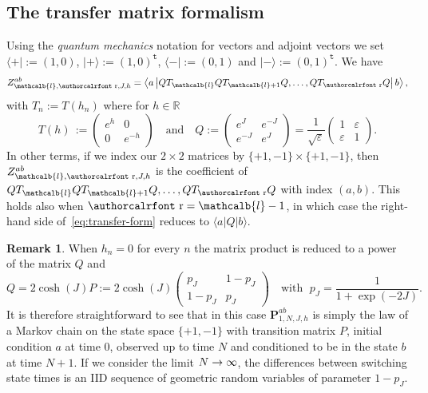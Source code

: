\documentclass[10pt]{amsart}
\theoremstyle{definition}\newtheorem{defi}[theo]{Definition}\newtheorem{rema}[theo]{Remark}\newtheorem{exam}[theo]{Example}\newtheorem{exem}[theo]{Example}\newtheorem{nota}[theo]{Notation}
\newcommand{\mathcalc}[1]{\text{\authorcalrfont #1}}
\newcommand{\bP}{\mathbf{P}}
\newcommand{\bbR}{\mathbb{R}}
\newcommand{\gep}{\varepsilon}
\newcommand{\ttt}{\mathtt{t}}
\newcommand{\tsp}{\ttt}
\renewcommand{\ell}{\mathcalb{l}}
\newcommand{\err}{\mathcalc{r}}
\renewcommand*{\to}{\mathchoice{\longrightarrow}{\rightarrow}{\rightarrow}{\rightarrow}}
\begin{document}
\subsection{The transfer matrix formalism}\label{sec:tm}

Using the \emph{quantum mechanics} notation for vectors and adjoint vectors we set $\langle +|:=(1,0)$, $|+ \rangle:=(1,0)^{\tsp}$, $\langle -|:=(0,1)$ and $| - \rangle := (0,1)^{\tsp}$. We have
\begin{equation}\label{eq:transfer-form}
{Z}_{\ell, \err, J, h}^{ab}= \left\langle a \left| Q T_\ell Q T_{\ell+1} Q,\dots, Q T_{\err} Q
\right| b \right\rangle,
\end{equation}
with $T_n:=T(h_n)$ where for $h \in \bbR$
\begin{equation}\label{eq:transmat}
T(h)\, :=
\begin{pmatrix}
e^{h} & 0\\
0 & e^{-h}
\end{pmatrix}
\quad\text{and} \quad Q :=
\begin{pmatrix}
e^{J} & e^{-J} \\
e^{-J} & e^{J}
\end{pmatrix} = \frac 1{\sqrt{\gep}}
\begin{pmatrix}
1 & \gep\\
\gep & 1
\end{pmatrix}
.
\end{equation}
In other terms, if we index our $2 \times 2$ matrices by $\{+1, -1\} \times \{+1, -1\}$, then ${Z}_{\ell, \err, J, h}^{ab}$ is the coefficient of $Q T_\ell Q T_{\ell+1} Q, \dots, Q T_{\err} Q$ with index $(a,b)$. This holds also when $\err=\ell-1$, in which case the right-hand side of~\eqref{eq:transfer-form} reduces to $\langle a | Q | b \rangle$.

\begin{rema}\label{rem:h=0}
When $h_n=0$ for every $n$ the matrix product is reduced to a power of the matrix $Q$ and
\begin{equation}
Q= 2 \cosh(J) P:= 2 \cosh(J)
\begin{pmatrix}
p_J & 1- p_J \\
1- p_J & p_J
\end{pmatrix}
\quad \text{with }\; p_J= \frac 1{ 1+\exp(-2J)}.
\end{equation}
It is therefore straightforward to see that in this case $\bP^{ab}_{1,N, J, h}$ is simply the law of a Markov chain on the state space $\{+1,-1\}$ with transition matrix $P$, initial condition $a$ at time $0$, observed up to time $N$ and conditioned to be in the state $b$ at time $N+1$. If we consider the limit $N\to \infty$, the differences between switching state times is an IID sequence of geometric random variables of parameter $1-p_J$.
\end{rema}
\end{document}

